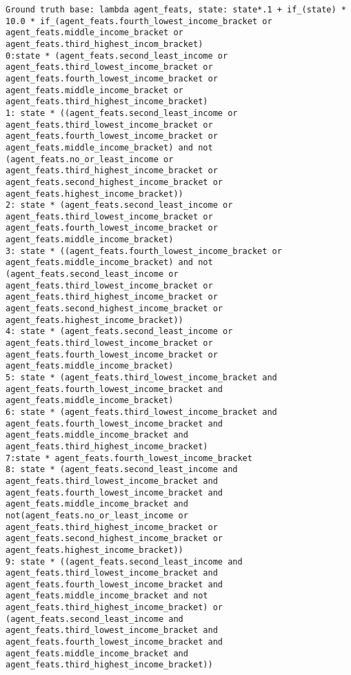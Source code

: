 \begin{lstlisting}
Ground truth base: lambda agent_feats, state: state*.1 + if_(state) * 10.0 * if_(agent_feats.fourth_lowest_income_bracket or agent_feats.middle_income_bracket or agent_feats.third_highest_incom_bracket)
0:state * (agent_feats.second_least_income or agent_feats.third_lowest_income_bracket or agent_feats.fourth_lowest_income_bracket or agent_feats.middle_income_bracket or agent_feats.third_highest_income_bracket) 
1: state * ((agent_feats.second_least_income or agent_feats.third_lowest_income_bracket or agent_feats.fourth_lowest_income_bracket or agent_feats.middle_income_bracket) and not (agent_feats.no_or_least_income or agent_feats.third_highest_income_bracket or agent_feats.second_highest_income_bracket or agent_feats.highest_income_bracket)) 
2: state * (agent_feats.second_least_income or agent_feats.third_lowest_income_bracket or agent_feats.fourth_lowest_income_bracket or agent_feats.middle_income_bracket) 
3: state * ((agent_feats.fourth_lowest_income_bracket or agent_feats.middle_income_bracket) and not (agent_feats.second_least_income or agent_feats.third_lowest_income_bracket or agent_feats.third_highest_income_bracket or agent_feats.second_highest_income_bracket or agent_feats.highest_income_bracket)) 
4: state * (agent_feats.second_least_income or agent_feats.third_lowest_income_bracket or agent_feats.fourth_lowest_income_bracket or agent_feats.middle_income_bracket) 
5: state * (agent_feats.third_lowest_income_bracket and agent_feats.fourth_lowest_income_bracket and agent_feats.middle_income_bracket) 
6: state * (agent_feats.third_lowest_income_bracket and agent_feats.fourth_lowest_income_bracket and agent_feats.middle_income_bracket and agent_feats.third_highest_income_bracket) 
7:state * agent_feats.fourth_lowest_income_bracket
8: state * (agent_feats.second_least_income and agent_feats.third_lowest_income_bracket and agent_feats.fourth_lowest_income_bracket and agent_feats.middle_income_bracket and not(agent_feats.no_or_least_income or agent_feats.third_highest_income_bracket or agent_feats.second_highest_income_bracket or agent_feats.highest_income_bracket)) 
9: state * ((agent_feats.second_least_income and agent_feats.third_lowest_income_bracket and agent_feats.fourth_lowest_income_bracket and agent_feats.middle_income_bracket and not agent_feats.third_highest_income_bracket) or (agent_feats.second_least_income and agent_feats.third_lowest_income_bracket and agent_feats.fourth_lowest_income_bracket and agent_feats.middle_income_bracket and agent_feats.third_highest_income_bracket)) 

\end{lstlisting}
